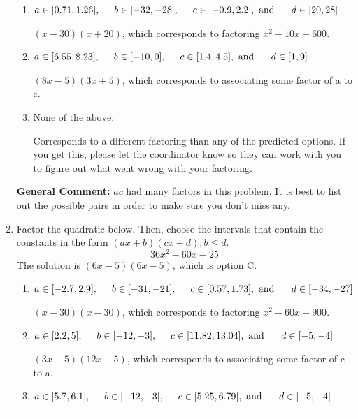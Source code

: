 \documentclass{extbook}[14pt]
\newcommand{\litem}[1]{\item #1

\rule{\textwidth}{0.4pt}}
\begin{document}
\begin{enumerate}
{\begin{enumerate}[label=\Alph*.]
* $(4x -5)(6x + 5)$, which is the correct option.
\item \( a \in [0.71, 1.26], \hspace*{5mm} b \in [-32, -28], \hspace*{5mm} c \in [-0.9, 2.2], \text{ and } \hspace*{5mm} d \in [20, 28] \)

 $(x -30)(x + 20)$, which corresponds to factoring $x^{2} -10 x -600$.
\item \( a \in [6.55, 8.23], \hspace*{5mm} b \in [-10, 0], \hspace*{5mm} c \in [1.4, 4.5], \text{ and } \hspace*{5mm} d \in [1, 9] \)

 $(8x -5)(3x + 5)$, which corresponds to associating some factor of a to c.
\item \( \text{None of the above.} \)

 Corresponds to a different factoring than any of the predicted options. If you get this, please let the coordinator know so they can work with you to figure out what went wrong with your factoring.
\end{enumerate}

\textbf{General Comment:} $ac$ had many factors in this problem. It is best to list out the possible pairs in order to make sure you don't miss any.
}
\litem{
Factor the quadratic below. Then, choose the intervals that contain the constants in the form $(ax+b)(cx+d); b \leq d.$
\[ 36x^{2} -60 x + 25 \]The solution is \( (6x -5)(6x -5) \), which is option C.\begin{enumerate}[label=\Alph*.]
\item \( a \in [-2.7, 2.9], \hspace*{5mm} b \in [-31, -21], \hspace*{5mm} c \in [0.57, 1.73], \text{ and } \hspace*{5mm} d \in [-34, -27] \)

 $(x -30)(x -30)$, which corresponds to factoring $x^{2} -60 x + 900$.
\item \( a \in [2.2, 5], \hspace*{5mm} b \in [-12, -3], \hspace*{5mm} c \in [11.82, 13.04], \text{ and } \hspace*{5mm} d \in [-5, -4] \)

 $(3x -5)(12x -5)$, which corresponds to associating some factor of c to a.
\item \( a \in [5.7, 6.1], \hspace*{5mm} b \in [-12, -3], \hspace*{5mm} c \in [5.25, 6.79], \text{ and } \hspace*{5mm} d \in [-5, -4] \)


\end{enumerate}}
\end{enumerate}
\end{document}
